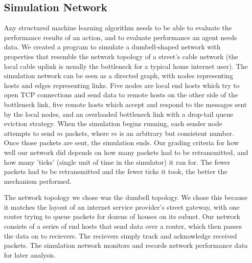 \documentclass[conference]{IEEEtran}
\begin{document}
\subsection{Simulation Network}
Any structured machine learning algorithm needs to be able to evaluate 
the performance results of an action, and to evaluate performance an agent 
needs data. We created a program to simulate a dumbell-shaped network 
with properties that resemble the network topology of a street's cable network
(the local cable uplink is usually the bottleneck for a typical home internet
user). The simulation network can be seen as a directed graph,
with nodes representing hosts and edges representing links. Five nodes are
local end hosts which try to open TCP connections and send data to remote hosts
on the other side of the bottleneck link, five remote hosts which accept and
respond to the messages sent by the local nodes, and an overloaded bottleneck
link with a drop-tail queue eviction strategy. When the simulation begins
running, each sender node attempts to send $m$ packets, where $m$ is an
arbitrary but consistent number. Once those packets are sent, the simulation
ends. Our grading criteria for how well our network did depends on how many
packets had to be retransmitted, and how many 'ticks' (single unit of time in
the simulator) it ran for. The fewer packets had to be retransmitted and the
fewer ticks it took, the better the mechanism performed.  

The network topology we chose was the dumbell topology. We chose this because
it matches the layout of an internet service provider's street gateway, with one
router trying to queue packets for dozens of houses on its subnet. Our
network consists of a series of end hosts that send data over a router, which
then passes the data on to recievers. The recievers simply track and acknowledge
received packets. The simulation network monitors and records network
performance data for later analysis.
\end{document}
